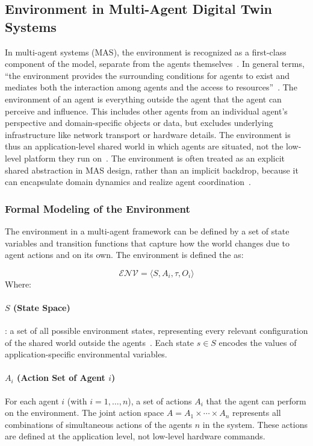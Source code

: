 \subsection{Environment in Multi-Agent Digital Twin Systems}

In multi-agent systems (MAS), the environment is recognized as a first-class component of the model, separate from the agents themselves~\cite{weyns2007environment}. In general terms, “the environment provides the surrounding conditions for agents to exist and mediates both the interaction among agents and the access to resources”~\cite{weyns2007environment}. The environment of an agent is everything outside the agent that the agent can perceive and influence. This includes other agents from an individual agent’s perspective and domain-specific objects or data, but excludes underlying infrastructure like network transport or hardware details. The environment is thus an application-level shared world in which agents are situated, not the low-level platform they run on~\cite{weyns2007environment}. The environment is often treated as an explicit shared abstraction in MAS design, rather than an implicit backdrop, because it can encapsulate domain dynamics and realize agent coordination~\cite{weyns2007environment}.

\subsubsection{Formal Modeling of the Environment}

The environment in a multi-agent framework can be defined by a set of state variables and transition functions that capture how the world changes due to agent actions and on its own. The environment is defined the as:

\[
\mathcal{ENV} = \langle S, A_i, \tau, O_i\rangle
\]
Where:

\paragraph{$S$ (State Space)}: a set of all possible environment states, representing every relevant configuration of the shared world outside the agents~\cite{belenguix2007formalmodel}. Each state $s \in S$ encodes the values of application-specific environmental variables.

\paragraph{$A_i$ (Action Set of Agent $i$)} For each agent $i$ (with $i=1,\dots,n$), a set of actions $A_i$ that the agent can perform on the environment. The joint action space $A = A_1 \times \cdots \times A_n$ represents all combinations of simultaneous actions of the agents $n$ in the system. These actions are defined at the application level, not low-level hardware commands.


